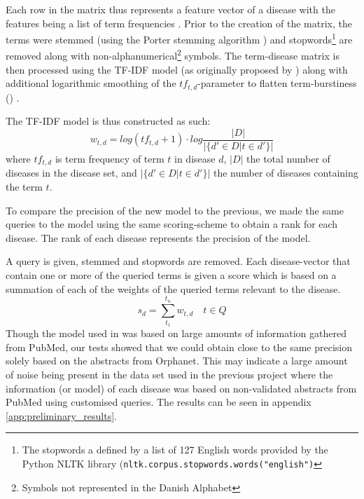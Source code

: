 \documentclass[10pt,letterpaper,final]{article}
\begin{document}

Each row in the matrix thus represents a feature vector of a disease
with the features being a list of term frequencies . Prior to the
creation of the matrix, the terms were stemmed (using the Porter
stemming algorithm ) and stopwords\footnote{The stopwords a defined by a
list of 127 English words provided by the Python NLTK library
(\texttt{nltk.corpus.stopwords.words("english")}} are removed along
with non-alphanumerical\footnote{Symbols not represented in the Danish
Alphabet} symbols. The term-disease matrix is then processed using the
TF-IDF model (as originally proposed by \cite{tfidf}) along with
additional logarithmic smoothing of the $tf_{t,d}$-parameter to flatten
term-burstiness (\cite{burstiness}) .

The TF-IDF model is thus constructed as such:
\[
w_{t,d} = log(tf_{t,d}+1)\cdot log\frac{|D|}{|\{d'\in D|t\in d'\}|}
\]
where $tf_{t,d}$ is term frequency of term $t$ in disease $d$, $|D|$ 
the total number of diseases in the disease set, and $|\{d'\in D|t\in
d'\}|$ the number of diseases containing the term $t$.

To compare the precision of the new model to the previous, we made the
same queries to the model using the same scoring-scheme to obtain a rank
for each disease. The rank of each disease represents the precision of
the model.

A query is given, stemmed and stopwords are removed. Each
disease-vector that contain one or more of the queried terms is given a
score which is based on a summation of each of the weights of the
queried terms relevant to the disease. 
\[
s_{d} = \displaystyle\sum\limits_{t_1}^{t_n} w_{t,d}\quad t \in Q
\]
Though the model used in \cite{jensenandersen} was based on large
amounts of information gathered from PubMed, our tests showed that we
could obtain close to the same precision solely based on the abstracts
from Orphanet. This may indicate a large amount of noise being present
in the data set used in the previous project where the information (or
model) of each disease was based on non-validated abstracts from PubMed
using customised queries. The results can be seen in appendix
\ref{app:preliminary_results}.
\end{document}
